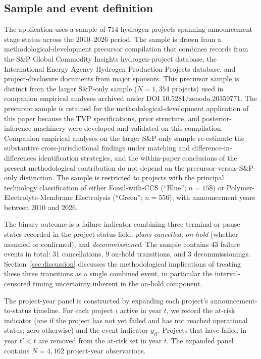 \documentclass[12pt,a4paper]{article}
\theoremstyle{plain}
\theoremstyle{definition}
\begin{document}
\subsection{Sample and event definition}

The application uses a sample of 714 hydrogen projects spanning announcement-stage status across the 2010--2026 period. The sample is drawn from a methodological-development precursor compilation that combines records from the S\&P Global Commodity Insights hydrogen-project database, the International Energy Agency Hydrogen Production Projects database, and project-disclosure documents from major sponsors. This precursor sample is distinct from the larger S\&P-only sample ($N = 1{,}354$ projects) used in companion empirical analyses archived under DOI 10.5281/zenodo.20359771. The precursor sample is retained for the methodological-development application of this paper because the TVP specifications, prior structure, and posterior-inference machinery were developed and validated on this compilation. Companion empirical analyses on the larger S\&P-only sample re-estimate the substantive cross-jurisdictional findings under matching and difference-in-differences identification strategies, and the within-paper conclusions of the present methodological contribution do not depend on the precursor-versus-S\&P-only distinction. The sample is restricted to projects with the principal technology classification of either Fossil-with-CCS (``Blue''; $n = 158$) or Polymer-Electrolyte-Membrane Electrolysis (``Green''; $n = 556$), with announcement years between 2010 and 2026.

The binary outcome is a failure indicator combining three terminal-or-pause states recorded in the project-status field: \emph{plans cancelled}, \emph{on-hold} (whether assumed or confirmed), and \emph{decommissioned}. The sample contains 43 failure events in total: 31 cancellations, 9 on-hold transitions, and 3 decommissionings. Section~\ref{sec:discussion} discusses the methodological implications of treating these three transitions as a single combined event, in particular the interval-censored timing uncertainty inherent in the on-hold component.

The project-year panel is constructed by expanding each project's announcement-to-status timeline. For each project $i$ active in year $t$, we record the at-risk indicator (one if the project has not yet failed and has not reached operational status; zero otherwise) and the event indicator $y_{it}$. Projects that have failed in year $t' < t$ are removed from the at-risk set in year $t$. The expanded panel contains $N = 4{,}162$ project-year observations.
\end{document}

